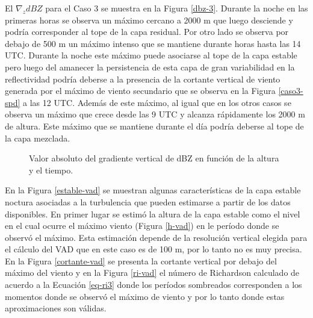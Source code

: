 \documentclass[12pt,spanish,oneside]{book}
\begin{document}
El \(\nabla_z dBZ\) para el Caso 3 se muestra en la Figura \ref{dbz-3}.
Durante la noche en las primeras horas se observa un máximo cercano a
2000 m que luego desciende y podría corresponder al tope de la capa
residual. Por otro lado se observa por debajo de 500 m un máximo intenso
que se mantiene durante horas hasta las 14 UTC. Durante la noche este
máximo puede asociarse al tope de la capa estable pero luego del
amanecer la persistencia de esta capa de gran variabilidad en la
reflectividad podría deberse a la presencia de la cortante vertical de
viento generada por el máximo de viento secundario que se observa en la
Figura \ref{caso3-spd} a las 12 UTC. Además de este máximo, al igual que
en los otros casos se observa un máximo que crece desde las 9 UTC y
alcanza rápidamente los 2000 m de altura. Este máximo que se mantiene
durante el día podría deberse al tope de la capa mezclada.

\begin{figure}

{\centering {}\newline{}\newline{}

}

\caption{Valor absoluto del gradiente vertical de dBZ en función de la altura y el tiempo. \label{pblh-dbz}}\label{fig:pblh-dbz}
\end{figure}

En la Figura \ref{estable-vad} se muestran algunas características de la
capa estable noctura asociadas a la turbulencia que pueden estimarse a
partir de los datos disponibles. En primer lugar se estimó la altura de
la capa estable como el nivel en el cual ocurre el máximo viento (Figura
\ref{h-vad}) en le período donde se observó el máximo. Esta estimación
depende de la resolución vertical elegida para el cálculo del VAD que en
este caso es de 100 m, por lo tanto no es muy precisa. En la Figura
\ref{cortante-vad} se presenta la cortante vertical por debajo del
máximo del viento y en la Figura \ref{ri-vad} el número de Richardson
calculado de acuerdo a la Ecuación \ref{eq-ri3} donde los períodos
sombreados corresponden a los momentos donde se observó el máximo de
viento y por lo tanto donde estas aproximaciones son válidas.
\end{document}
